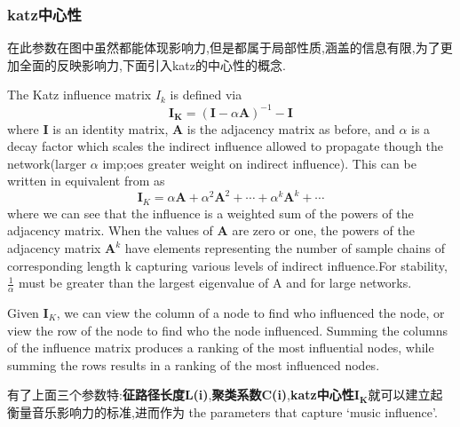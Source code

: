 \documentclass[a4paper,12pt]{article}
\begin{document}
\begin{spacing}{1.2}
		\subsubsection{katz中心性}
		在此参数在图中虽然都能体现影响力,但是都属于局部性质,涵盖的信息有限,为了更加全面的反映影响力,下面引入katz的中心性的概念.
		\par
		The Katz influence matrix $I_{k}$ is defined via
		$$
		\bm{I_{K}}=(\bm{I}-\alpha \bm{A})^{-1}-\bm{I}
		$$
		where $\bm{I}$ is an identity matrix, $\bm{A}$ is the adjacency matrix as before, and $\alpha$ is a decay factor which scales the indirect influence allowed to propagate though the network(larger $\alpha$ imp;oes greater weight on indirect influence). This can be written in equivalent from as
		$$
		\bm{I}_{K}=\alpha\bm{A}+{\alpha}^{2}\bm{A}^{2}+\cdots+{\alpha}^{k}\bm{A}^{k}+\cdots
		$$
		where we can see that the influence is a weighted sum of the powers of the adjacency matrix. When the values of $\bm{A}$ are zero or one, the powers of the adjacency matrix $\bm{A}^k$ have elements representing the number of sample chains of corresponding length k capturing various levels of indirect influence.For stability,
		$\frac{1}{\alpha}$ must be greater than the largest eigenvalue of A and for large networks.
		\par
		 Given $\bm{I}_{K}$, we can view the column of a node to find who influenced the node, or view the row of the node to find who the node influenced. Summing the columns of the influence matrix produces a ranking of the most influential nodes, while summing the rows results in a ranking of the most influenced nodes.
		 \par
		 有了上面三个参数特:\textbf{征路径长度L(i)},\textbf{聚类系数C(i)},\textbf{katz中心性}$\bm{I_{K}}$就可以建立起衡量音乐影响力的标准,进而作为 the parameters that capture ‘music influence’.

\end{spacing}
\end{document}
